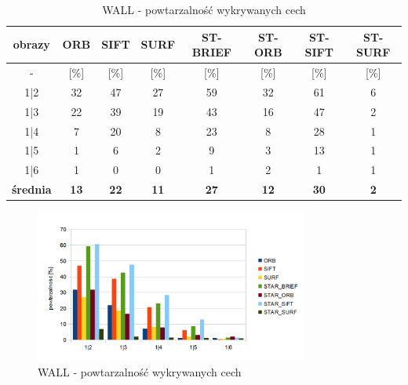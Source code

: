 \begin{table}[htbp]
  \centering
  \caption{WALL - powtarzalność wykrywanych cech}
    \begin{tabular}{|c|c|c|c|c|c|c|c|}\hline

    obrazy & \textbf{ORB} & \textbf{SIFT} & \textbf{SURF} & \textbf{ST-BRIEF} & \textbf{ST-ORB} & \textbf{ST-SIFT} & \textbf{ST-SURF} \\\hline

    -  & [\%] & [\%] & [\%] & [\%] & [\%] & [\%] & [\%] \\\hline
    1|2 & 32 & 47 & 27 & 59 & 32 & 61 & 6 \\
    1|3 & 22 & 39 & 19 & 43 & 16 & 47 & 2 \\
    1|4 & 7 & 20 & 8 & 23 & 8 & 28 & 1 \\
    1|5 & 1 & 6 & 2 & 9 & 3 & 13 & 1 \\
    1|6 & 1 & 0 & 0 & 1 & 2 & 1 & 1 \\\hline
    \textbf{średnia} & \textbf{13} & \textbf{22} & \textbf{11} & \textbf{27} & \textbf{12} & \textbf{30} & \textbf{2} \\\hline
    

    \end{tabular}%
  \label{tab:wall_m1}%
\end{table}%


\begin{figure}
\centering
\includegraphics[width=0.8\textwidth]{pict/mikolajczyk/wall/m1.png}
\caption{WALL - powtarzalność wykrywanych cech}
\label{fig:wall_m1}
\end{figure}


